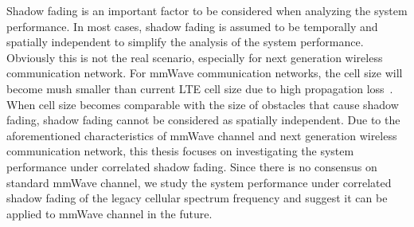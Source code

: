 \par Shadow fading is an important factor to be considered when analyzing the system performance. In most cases, shadow fading is assumed to be temporally and spatially independent to simplify the analysis of the system performance. Obviously this is not the real scenario, especially for next generation wireless communication network. For mmWave communication networks, the cell size will become mush smaller than current LTE cell size due to high propagation loss~. When cell size becomes comparable with the size of obstacles that cause shadow fading, shadow fading cannot be considered as spatially independent. Due to the aforementioned characteristics of mmWave channel and next generation wireless communication network, this thesis focuses on investigating the system performance under correlated shadow fading. Since there is no consensus on standard mmWave channel, we study the system performance under correlated shadow fading of the legacy cellular spectrum frequency and suggest it can be applied to mmWave channel in the future. 

